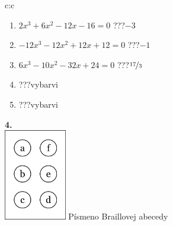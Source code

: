 \documentclass[10pt]{report}
\begin{document}
\begin{tabular}{c:c}
\begin{minipage}[c][104.5mm][t]{0.5\linewidth}
\begin{center}
\begin{minipage}{0.79\linewidth}
\begin{center}
\begin{varwidth}{\linewidth}
\begin{enumerate}
\item $2x^3+6x^2-12x-16=0$\quad \dotfill\; ???\;\dotfill \quad $-3$
\item $-12x^3-12x^2+12x+12=0$\quad \dotfill\; ???\;\dotfill \quad $-1$
\item $6x^3-10x^2-32x+24=0$\quad \dotfill\; ???\;\dotfill \quad $\nicefrac{17}{3}$
\item \quad \dotfill\; ???\;\dotfill \quad vybarvi
\item \quad \dotfill\; ???\;\dotfill \quad vybarvi
\end{enumerate}
\end{varwidth}
\end{center}
\end{minipage}
\begin{minipage}{0.20\linewidth}
\begin{center}
{\Huge\bfseries 4.} \\[2mm]
\includegraphics[height=40mm]{../images/braille.png}
{\small Písmeno Braillovej abecedy}
\end{center}
\end{minipage}
\end{center}
\end{minipage}
%
\end{tabular}
\newpage
\thispagestyle{empty}
\end{document}

